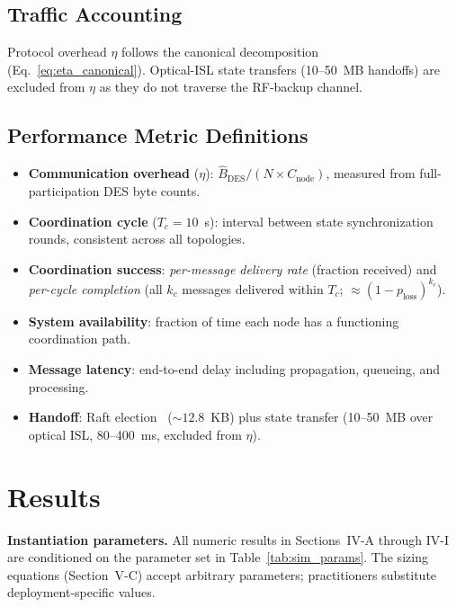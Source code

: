 \documentclass[journal]{IEEEtran}
\begin{document}
\subsection{Traffic Accounting}

Protocol overhead $\eta$ follows the canonical decomposition (Eq.~\ref{eq:eta_canonical}). Optical-ISL state transfers (10--50~MB handoffs) are excluded from $\eta$ as they do not traverse the RF-backup channel.

\subsection{Performance Metric Definitions}
\label{sec:metric_definitions}

\begin{itemize}
    \item \textbf{Communication overhead} ($\eta$): $\hat{B}_{\text{DES}} / (N \times C_{\text{node}})$, measured from full-participation DES byte counts.
    \item \textbf{Coordination cycle} ($T_c = 10$~s): interval between state synchronization rounds, consistent across all topologies.
    \item \textbf{Coordination success}: \emph{per-message delivery rate} (fraction received) and \emph{per-cycle completion} (all $k_c$ messages delivered within $T_c$; $\approx (1 - p_{\text{loss}})^{k_c}$).
    \item \textbf{System availability}: fraction of time each node has a functioning coordination path.
    \item \textbf{Message latency}: end-to-end delay including propagation, queueing, and processing.
    \item \textbf{Handoff}: Raft election~\cite{ongaro_raft} (${\sim}12.8$~KB) plus state transfer (10--50~MB over optical ISL, 80--400~ms, excluded from $\eta$).
\end{itemize}

\section{Results}

\textbf{Instantiation parameters.} All numeric results in Sections~IV-A through IV-I are conditioned on the parameter set in Table~\ref{tab:sim_params}. The sizing equations (Section~V-C) accept arbitrary parameters; practitioners substitute deployment-specific values.
\end{document}
